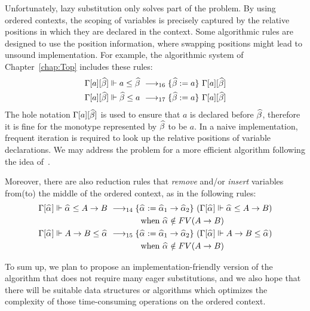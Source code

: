 Unfortunately, lazy substitution only solves part of the problem.
By using ordered contexts, the scoping of variables is precisely captured by
the relative positions in which they are declared in the context.
Some algorithmic rules are designed to use the position information,
where swapping positions might lead to unsound implementation.
For example, the algorithmic system of Chapter~\ref{chap:Top}
includes these rules:
\begin{gather*}
\begin{aligned}
    \Gm[a][\bt] \Vdash a \le \bt &\rrule{16} \{\bt := a\}~\Gm[a][\bt]\\
    \Gm[a][\bt] \Vdash \bt \le a &\rrule{17} \{\bt := a\}~\Gm[a][\bt]\\
\end{aligned}
\end{gather*}
The hole notation $\Gm[a][\bt]$ is used to ensure that $a$ is declared before $\bt$,
therefore it is fine for the monotype represented by $\bt$ to be $a$.
In a naive implementation, frequent iteration is required to look up the
relative positions of variable declarations.
We may address the problem for a more efficient algorithm following the idea
of~\cite{Remy92extensionof}.

Moreover, there are also reduction rules that \emph{remove}
and/or \emph{insert} variables from(to) the middle of the ordered context,
as in the following rules:
\begin{gather*}
\begin{aligned}
\Gm[\al] \Vdash \al \le A\to B &\rrule{14}
    \{\al := \al[1] \to \al[2]\}~(\Gm[\al] \Vdash \al \le A\to B)\\
    &\qquad\qquad \text{when } \al\notin FV(A \to B)\\
\Gm[\al] \Vdash A\to B \le \al &\rrule{15}
    \{\al := \al[1] \to \al[2]\}~(\Gm[\al] \Vdash A\to B \le \al)\\
    &\qquad\qquad \text{when } \al\notin  FV(A \to B)\\
\end{aligned}
\end{gather*}

To sum up,
we plan to propose an implementation-friendly version of the algorithm
that does not require many eager substitutions,
and we also hope that there will be suitable data structures or algorithms
which optimizes the complexity of those time-consuming operations on the ordered context.


